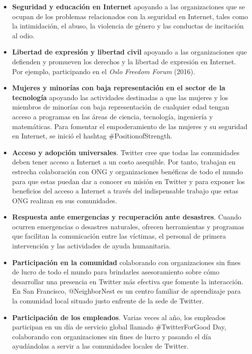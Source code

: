 \begin{itemize}

\item \textbf{Seguridad y educación en Internet} apoyando a las organizaciones que se ocupan de los problemas relacionados con la seguridad en Internet, tales como la intimidación, el abuso, la violencia de género y las conductas de incitación al odio.

\item \textbf{Libertad de expresión y libertad civil} apoyando a las organizaciones que defienden y promueven los derechos y la libertad de expresión en Internet. Por ejemplo, participando en el \textit{Oslo Freedom Forum} (2016).

\item \textbf{Mujeres y minorías con baja representación en el sector de la tecnología} apoyando las actividades destinadas a que las mujeres y los miembros de minorías con baja representación de cualquier edad tengan acceso a programas en las áreas de ciencia, tecnología, ingeniería y matemáticas. Para fomentar el empoderamiento de las mujeres y su seguridad en Internet, se inició el hashtag \#PositionofStrength.

\item \textbf{Acceso y adopción universales}. Twitter cree que todas las comunidades deben tener acceso a Internet a un costo asequible. Por tanto, trabajan en estrecha colaboración con ONG y organizaciones benéficas de todo el mundo para que estas puedan dar a conocer su misión en Twitter y para exponer los beneficios del acceso a Internet a través del indispensable trabajo que estas ONG realizan en sus comunidades.

\item \textbf{Respuesta ante emergencias y recuperación ante desastres}. Cuando ocurren emergencias o desastres naturales, ofrecen herramientas y programas que facilitan la comunicación entre las víctimas, el personal de primera intervención y las actividades de ayuda humanitaria.

\item \textbf{Participación en la comunidad} colaborando con organizaciones sin fines de lucro de todo el mundo para brindarles asesoramiento sobre cómo desarrollar una presencia en Twitter más efectiva que fomente la interacción. En San Francisco, $‎@$NeighborNest‎ es un centro familiar de aprendizaje para la comunidad local situado justo enfrente de la sede de Twitter.

\item \textbf{Participación de los empleados}. Varias veces al año, los empleados participan en un día de servicio global llamado \#TwitterForGood Day, colaborando con organizaciones sin fines de lucro y pasando el día ayudándolas a servir a las comunidades locales de Twitter.

\end{itemize}

